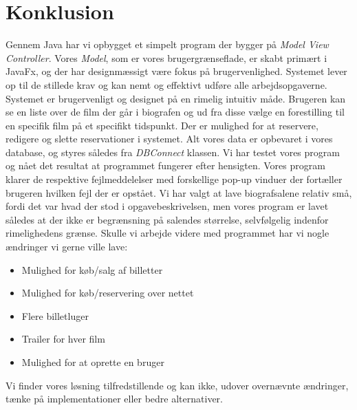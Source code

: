 \documentclass[final]{report}
\begin{document}
\chapter{Konklusion}
Gennem Java har vi opbygget et simpelt program der bygger på \emph{Model View Controller}. Vores \emph{Model}, som er vores brugergrænseflade, er skabt primært i JavaFx, og der har designmæssigt være fokus på brugervenlighed. 
Systemet lever op til de stillede krav og kan nemt og effektivt udføre alle arbejdsopgaverne. Systemet er brugervenligt og designet på en rimelig intuitiv måde. Brugeren kan se en liste over de film der går i biografen og ud fra disse vælge en forestilling til en specifik film på et specifikt tidspunkt. Der er mulighed for at reservere, redigere og slette reservationer i systemet. Alt vores data er opbevaret i vores database, og styres således fra \emph{DBConnect} klassen. Vi har testet vores program og nået det resultat at programmet fungerer efter hensigten. Vores program klarer de respektive fejlmeddelelser med forskellige pop-up vinduer der fortæller brugeren hvilken fejl der er opstået. Vi har valgt at lave biografsalene relativ små, fordi det var hvad der stod i opgavebeskrivelsen, men vores program er lavet således at der ikke er begrænsning på salendes størrelse, selvfølgelig indenfor rimelighedens grænse. Skulle vi arbejde videre med programmet har vi nogle ændringer vi gerne ville lave:

\begin{itemize}
\item Mulighed for køb/salg af billetter
\item Mulighed for køb/reservering over nettet
\item Flere billetluger
\item Trailer for hver film
\item Mulighed for at oprette en bruger
\end{itemize}

Vi finder vores løsning tilfredstillende og kan ikke, udover overnævnte ændringer, tænke på implementationer eller bedre alternativer.

\printbibliography

\listoffigures
\end{document}
